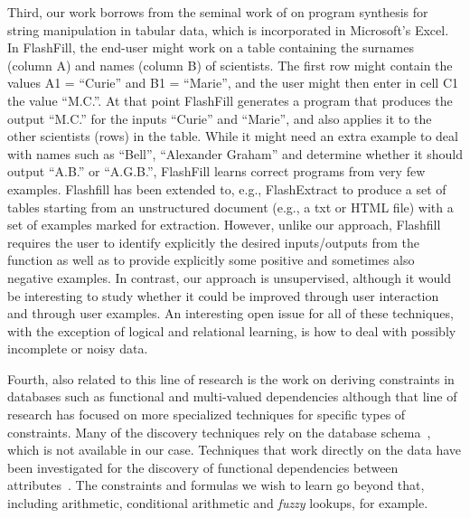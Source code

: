 Third, our work borrows from the seminal work of \textcite{flashfill} on program synthesis for string manipulation in tabular data, which is incorporated in Microsoft's Excel. In FlashFill, the end-user might work on a table containing the surnames (column A) and names (column B) of scientists. The first row might contain the values A1 = ``Curie'' and B1 = ``Marie'', and the user might then enter in cell C1 the value ``M.C.''. At that point FlashFill generates a program that produces the output ``M.C.'' for the inputs ``Curie'' and ``Marie'', and also applies it to the other scientists (rows) in the table. While it might need an extra example to deal with names such as ``Bell'', ``Alexander Graham'' and determine whether it should output ``A.B.'' or ``A.G.B.'', FlashFill learns correct programs from very few examples. Flashfill has been extended to, e.g., FlashExtract \parencite{flashextract} to produce a set of tables starting from an unstructured document (e.g., a txt or HTML file) with a set of examples marked for extraction. However, unlike our approach, Flashfill requires the user to identify explicitly the desired inputs/outputs from the function as well as to provide explicitly some positive and sometimes also negative examples.  In contrast, our approach is unsupervised, although it would be interesting to study whether it could be improved through user interaction and through user examples.  An interesting open issue for all of these techniques, with the exception of logical and relational learning, is how to deal with possibly incomplete or noisy data.

Fourth, also related to this line of research is the work on deriving constraints in databases such as functional and multi-valued dependencies \parencite{savnik, Mannila-Raiha} although that line of research has focused on more specialized techniques for specific types of constraints. Many of the discovery techniques rely on the database schema~\parencite{flach_dependency_discovery}, which is not available in our case. Techniques that work directly on the data have been investigated for the discovery of functional dependencies between attributes~\parencite{tane_dependency_discovery}. The constraints and formulas we wish to learn go beyond that, including arithmetic, conditional arithmetic and \textit{fuzzy} lookups, for example.

